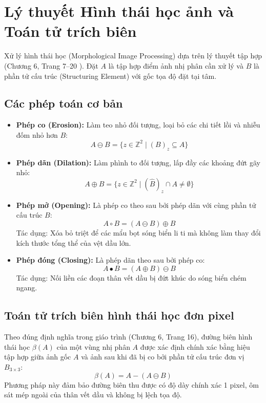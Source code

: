 \section{Lý thuyết Hình thái học ảnh và Toán tử trích biên}
\label{sec:morphology_theory}
Xử lý hình thái học (Morphological Image Processing) dựa trên lý thuyết tập hợp (Chương 6, Trang 7--20 \cite{toan2024xla}). Đặt $A$ là tập hợp điểm ảnh nhị phân cần xử lý và $B$ là phần tử cấu trúc (Structuring Element) với gốc tọa độ đặt tại tâm.

\subsection{Các phép toán cơ bản}
\begin{itemize}
    \item \textbf{Phép co (Erosion):} Làm teo nhỏ đối tượng, loại bỏ các chi tiết lồi và nhiễu đốm nhỏ hơn $B$:
    \begin{equation}
        A \ominus B = \{ z \in \mathbb{Z}^2 \mid (B)_z \subseteq A \}
    \end{equation}
    \item \textbf{Phép dãn (Dilation):} Làm phình to đối tượng, lấp đầy các khoảng đứt gãy nhỏ:
    \begin{equation}
        A \oplus B = \{ z \in \mathbb{Z}^2 \mid (\hat{B})_z \cap A \neq \emptyset \}
    \end{equation}
    \item \textbf{Phép mở (Opening):} Là phép co theo sau bởi phép dãn với cùng phần tử cấu trúc $B$:
    \begin{equation}
        A \circ B = (A \ominus B) \oplus B
    \end{equation}
    Tác dụng: Xóa bỏ triệt để các mẩu bọt sóng biển li ti mà không làm thay đổi kích thước tổng thể của vệt dầu lớn.
    \item \textbf{Phép đóng (Closing):} Là phép dãn theo sau bởi phép co:
    \begin{equation}
        A \bullet B = (A \oplus B) \ominus B
    \end{equation}
    Tác dụng: Nối liền các đoạn thân vết dầu bị đứt khúc do sóng biển chém ngang.
\end{itemize}

\subsection{Toán tử trích biên hình thái học đơn pixel}
Theo đúng định nghĩa trong giáo trình (Chương 6, Trang 16), đường biên hình thái học $\beta(A)$ của một vùng nhị phân $A$ được xác định chính xác bằng hiệu tập hợp giữa ảnh gốc $A$ và ảnh sau khi đã bị co bởi phần tử cấu trúc đơn vị $B_{3 \times 3}$:
\begin{equation}
    \beta(A) = A - (A \ominus B)
    \label{eq:morph_boundary}
\end{equation}
Phương pháp này đảm bảo đường biên thu được có độ dày chính xác 1 pixel, ôm sát mép ngoài của thân vết dầu và không bị lệch tọa độ.

